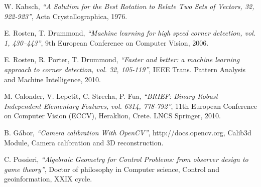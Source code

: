 \documentclass[a4paper, 12pt]{report}
\numberwithin{equation}{section}
\begin{document}







%
%









\listoffigures



\begin{thebibliography}{9}
        W. Kabsch,
            \emph{``A Solution for the Best Rotation to Relate Two Sets of Vectors, 32, 922-923''},
          Acta Crystallographica, 1976.
        
        E. Rosten, T. Drummond,
        \emph{``Machine learning for high speed corner detection, vol. 1, 430–443''},
        9th European Conference on Computer Vision, 2006.
       
       	E. Rosten, R. Porter, T. Drummond,
       	\emph{``Faster and better: a machine learning approach to corner detection, vol. 32, 105-119''},
       	IEEE Trans. Pattern Analysis and Machine Intelligence, 2010.
       	
       	M. Calonder, V. Lepetit, C. Strecha, P. Fua,
       	\emph{``BRIEF: Binary Robust Independent Elementary Features, vol. 6314, 778-792''},
       	11th European Conference on Computer Vision (ECCV), Heraklion, Crete. LNCS Springer, 2010.
       	
      	 B. Gábor,
      	\emph{``Camera calibration With OpenCV''},
      	http://docs.opencv.org, Calib3d Module, Camera calibration and 3D reconstruction. 
      	
      	 C. Possieri, 
      	\emph{``Algebraic Geometry for Control Problems: from observer design to game theory''},
      	Doctor of philosophy in Computer science, Control and geoinformation, XXIX cycle.
      	
\end{thebibliography}
\end{document}
